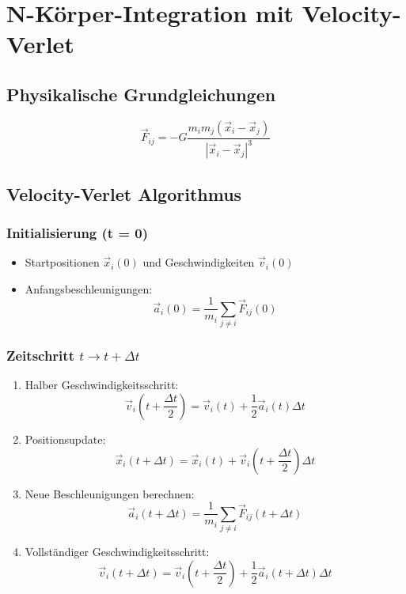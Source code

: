 \section{N-Körper-Integration mit Velocity-Verlet}

\subsection{Physikalische Grundgleichungen}
\begin{equation}
\vec{F}_{ij} = -G \frac{m_i m_j (\vec{x}_i - \vec{x}_j)}{|\vec{x}_i - \vec{x}_j|^3}
\end{equation}

\subsection{Velocity-Verlet Algorithmus}
\subsubsection{Initialisierung (t = 0)}
\begin{itemize}
    \item Startpositionen $\vec{x}_i(0)$ und Geschwindigkeiten $\vec{v}_i(0)$
    \item Anfangsbeschleunigungen:
    \begin{equation}
    \vec{a}_i(0) = \frac{1}{m_i} \sum_{j \neq i} \vec{F}_{ij}(0)
    \end{equation}
\end{itemize}

\subsubsection{Zeitschritt $t \to t + \Delta t$}
\begin{enumerate}
    \item Halber Geschwindigkeitsschritt:
    \begin{equation}
    \vec{v}_i\left(t + \frac{\Delta t}{2}\right) = \vec{v}_i(t) + \frac{1}{2} \vec{a}_i(t) \Delta t
    \end{equation}
    
    \item Positionsupdate:
    \begin{equation}
    \vec{x}_i(t + \Delta t) = \vec{x}_i(t) + \vec{v}_i\left(t + \frac{\Delta t}{2}\right) \Delta t
    \end{equation}
    
    \item Neue Beschleunigungen berechnen:
    \begin{equation}
    \vec{a}_i(t + \Delta t) = \frac{1}{m_i} \sum_{j \neq i} \vec{F}_{ij}(t + \Delta t)
    \end{equation}
    
    \item Vollständiger Geschwindigkeitsschritt:
    \begin{equation}
    \vec{v}_i(t + \Delta t) = \vec{v}_i\left(t + \frac{\Delta t}{2}\right) + \frac{1}{2} \vec{a}_i(t + \Delta t) \Delta t
    \end{equation}
\end{enumerate}

